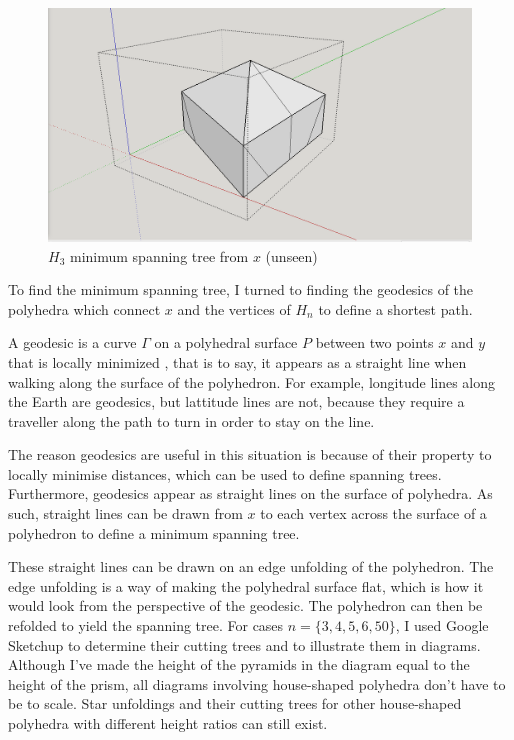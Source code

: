 \documentclass[12 pt]{article}
\begin{document}
\begin{figure}[h]
\caption{$H_3$ minimum spanning tree from $x$ (unseen)}
\centering
\includegraphics[scale=0.35]{starUnfolding/h3FinalIso.png}
\end{figure}

To find the minimum spanning tree, I turned to finding the geodesics of the polyhedra which connect $x$ and the vertices of $H_n$ to define a shortest path.

A geodesic is a curve $\Gamma$ on a polyhedral surface $P$ between two points $x$ and $y$ that is locally minimized \cite{GFALOP:1}, that is to say, it appears as a straight line when walking along the surface of the polyhedron. For example, longitude lines along the Earth are geodesics, but lattitude lines are not, because they require a traveller along the path to turn in order to stay on the line. 

The reason geodesics are useful in this situation is because of their property to locally minimise distances, which can be used to define spanning trees. Furthermore, geodesics appear as straight lines on the surface of polyhedra. As such, straight lines can be drawn from $x$ to each vertex across the surface of a polyhedron to define a minimum spanning tree.

These straight lines can be drawn on an edge unfolding of the polyhedron. The edge unfolding is a way of making the polyhedral surface flat, which is how it would look from the perspective of the geodesic. The polyhedron can then be refolded to yield the spanning tree.
For cases $n=\{3,4,5,6,50\}$, I  used Google Sketchup to determine their cutting trees and to illustrate them in diagrams.
Although I've made the height of the pyramids in the diagram equal to the height of the prism, all diagrams involving house-shaped polyhedra don't have to be to scale. Star unfoldings and their cutting trees for other house-shaped polyhedra with different height ratios can still exist.
\end{document}
